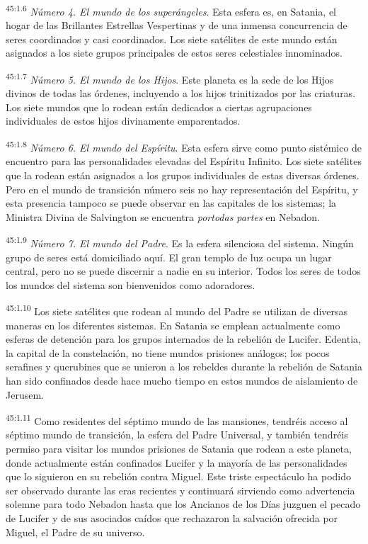 \par
\textsuperscript{45:1.6} \textit{Número 4. El mundo de los superángeles}. Esta esfera es, en Satania, el hogar de las Brillantes Estrellas Vespertinas y de una inmensa concurrencia de seres coordinados y casi coordinados. Los siete satélites de este mundo están asignados a los siete grupos principales de estos seres celestiales innominados.

\par
\textsuperscript{45:1.7} \textit{Número 5. El mundo de los Hijos}. Este planeta es la sede de los Hijos divinos de todas las órdenes, incluyendo a los hijos trinitizados por las criaturas. Los siete mundos que lo rodean están dedicados a ciertas agrupaciones individuales de estos hijos divinamente emparentados.

\par
\textsuperscript{45:1.8} \textit{Número 6. El mundo del Espíritu}. Esta esfera sirve como punto sistémico de encuentro para las personalidades elevadas del Espíritu Infinito. Los siete satélites que la rodean están asignados a los grupos individuales de estas diversas órdenes. Pero en el mundo de transición número seis no hay representación del Espíritu, y esta presencia tampoco se puede observar en las capitales de los sistemas; la Ministra Divina de Salvington se encuentra \textit{portodas partes} en Nebadon.

\par
\textsuperscript{45:1.9} \textit{Número 7. El mundo del Padre}. Es la esfera silenciosa del sistema. Ningún grupo de seres está domiciliado aquí. El gran templo de luz ocupa un lugar central, pero no se puede discernir a nadie en su interior. Todos los seres de todos los mundos del sistema son bienvenidos como adoradores.

\par
\textsuperscript{45:1.10} Los siete satélites que rodean al mundo del Padre se utilizan de diversas maneras en los diferentes sistemas. En Satania se emplean actualmente como esferas de detención para los grupos internados de la rebelión de Lucifer. Edentia, la capital de la constelación, no tiene mundos prisiones análogos; los pocos serafines y querubines que se unieron a los rebeldes durante la rebelión de Satania han sido confinados desde hace mucho tiempo en estos mundos de aislamiento de Jerusem.

\par
\textsuperscript{45:1.11} Como residentes del séptimo mundo de las mansiones, tendréis acceso al séptimo mundo de transición, la esfera del Padre Universal, y también tendréis permiso para visitar los mundos prisiones de Satania que rodean a este planeta, donde actualmente están confinados Lucifer y la mayoría de las personalidades que lo siguieron en su rebelión contra Miguel. Este triste espectáculo ha podido ser observado durante las eras recientes y continuará sirviendo como advertencia solemne para todo Nebadon hasta que los Ancianos de los Días juzguen el pecado de Lucifer y de sus asociados caídos que rechazaron la salvación ofrecida por Miguel, el Padre de su universo.


